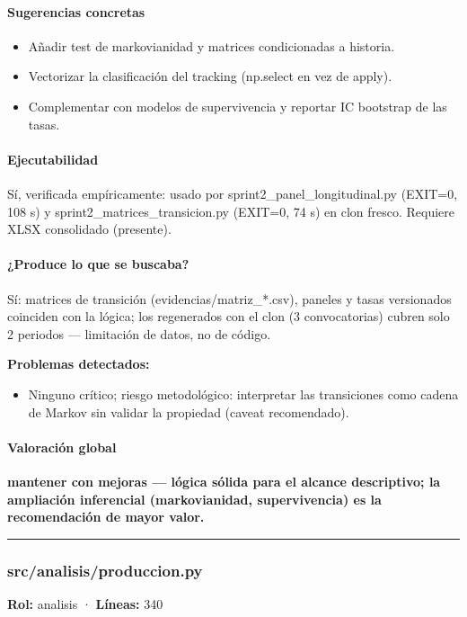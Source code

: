 \paragraph{Sugerencias concretas}
\begin{itemize}
  \item Añadir test de markovianidad y matrices condicionadas a historia.
  \item Vectorizar la clasificación del tracking (np.select en vez de apply).
  \item Complementar con modelos de supervivencia y reportar IC bootstrap de las tasas.
\end{itemize}

\paragraph{Ejecutabilidad}
Sí, verificada empíricamente: usado por sprint2\_panel\_longitudinal.py (EXIT=0, 108 s) y sprint2\_matrices\_transicion.py (EXIT=0, 74 s) en clon fresco. Requiere XLSX consolidado (presente).

\paragraph{¿Produce lo que se buscaba?}
Sí: matrices de transición (evidencias/matriz\_*.csv), paneles y tasas versionados coinciden con la lógica; los regenerados con el clon (3 convocatorias) cubren solo 2 periodos --- limitación de datos, no de código.

\begin{tcolorbox}[riesgo]
\textbf{Problemas detectados:}
\begin{itemize}
  \item Ninguno crítico; riesgo metodológico: interpretar las transiciones como cadena de Markov sin validar la propiedad (caveat recomendado).
\end{itemize}
\end{tcolorbox}

\paragraph{Valoración global}
\textbf{mantener con mejoras --- lógica sólida para el alcance descriptivo; la ampliación inferencial (markovianidad, supervivencia) es la recomendación de mayor valor.}

\medskip
\hrule

\subsubsection{src/analisis/produccion.py}
\textbf{Rol:} analisis · \textbf{Líneas:} 340

